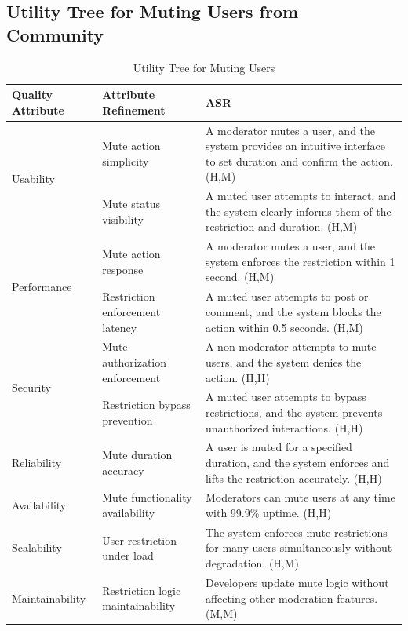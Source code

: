 \documentclass{article}
\begin{document}
\subsection{Utility Tree for Muting Users from Community}

\begin{table}[H]
\centering
\caption{Utility Tree for Muting Users}
\begin{tabular}{|p{3cm}|p{4cm}|p{7cm}|}
\hline
\textbf{Quality Attribute} & \textbf{Attribute Refinement} & \textbf{ASR} \\
\hline

\multirow{2}{*}{Usability}
& Mute action simplicity
& A moderator mutes a user, and the system provides an intuitive interface to set duration and confirm the action. (H,M) \\
\cline{2-3}
& Mute status visibility
& A muted user attempts to interact, and the system clearly informs them of the restriction and duration. (H,M) \\
\hline

\multirow{2}{*}{Performance}
& Mute action response
& A moderator mutes a user, and the system enforces the restriction within 1 second. (H,M) \\
\cline{2-3}
& Restriction enforcement latency
& A muted user attempts to post or comment, and the system blocks the action within 0.5 seconds. (H,M) \\
\hline

\multirow{2}{*}{Security}
& Mute authorization enforcement
& A non-moderator attempts to mute users, and the system denies the action. (H,H) \\
\cline{2-3}
& Restriction bypass prevention
& A muted user attempts to bypass restrictions, and the system prevents unauthorized interactions. (H,H) \\
\hline

Reliability
& Mute duration accuracy
& A user is muted for a specified duration, and the system enforces and lifts the restriction accurately. (H,H) \\
\hline

Availability
& Mute functionality availability
& Moderators can mute users at any time with 99.9\% uptime. (H,H) \\
\hline

Scalability
& User restriction under load
& The system enforces mute restrictions for many users simultaneously without degradation. (H,M) \\
\hline

Maintainability
& Restriction logic maintainability
& Developers update mute logic without affecting other moderation features. (M,M) \\
\hline


\end{tabular}
\end{table}
\end{document}
